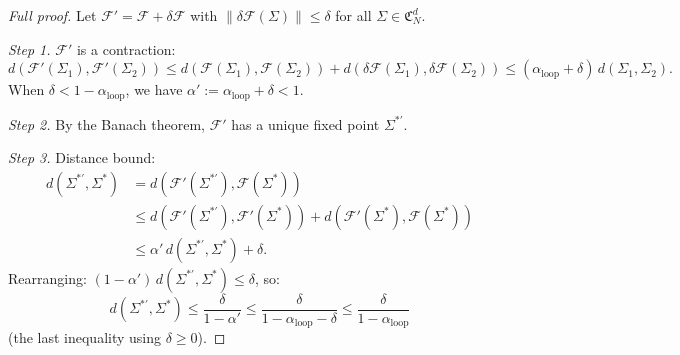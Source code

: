 \begin{proof}[Full proof]
Let $\mathcal{F}' = \mathcal{F} + \delta\mathcal{F}$ with
$\|\delta\mathcal{F}(\Sigma)\| \leq \delta$ for all
$\Sigma \in \mathfrak{C}_N^d$.

\emph{Step 1.}  $\mathcal{F}'$ is a contraction:
\[
  d(\mathcal{F}'(\Sigma_1), \mathcal{F}'(\Sigma_2))
  \leq d(\mathcal{F}(\Sigma_1), \mathcal{F}(\Sigma_2))
  + d(\delta\mathcal{F}(\Sigma_1), \delta\mathcal{F}(\Sigma_2))
  \leq (\alpha_{\mathrm{loop}} + \delta)\,d(\Sigma_1, \Sigma_2).
\]
When $\delta < 1 - \alpha_{\mathrm{loop}}$, we have
$\alpha' := \alpha_{\mathrm{loop}} + \delta < 1$.

\emph{Step 2.}  By the Banach theorem, $\mathcal{F}'$ has a unique
fixed point $\Sigma^{*\prime}$.

\emph{Step 3.}  Distance bound:
\begin{align*}
  d(\Sigma^{*\prime}, \Sigma^*)
  &= d(\mathcal{F}'(\Sigma^{*\prime}), \mathcal{F}(\Sigma^*)) \\
  &\leq d(\mathcal{F}'(\Sigma^{*\prime}), \mathcal{F}'(\Sigma^*))
  + d(\mathcal{F}'(\Sigma^*), \mathcal{F}(\Sigma^*)) \\
  &\leq \alpha' \, d(\Sigma^{*\prime}, \Sigma^*) + \delta.
\end{align*}
Rearranging: $(1 - \alpha')\,d(\Sigma^{*\prime}, \Sigma^*) \leq \delta$,
so:
\[
  d(\Sigma^{*\prime}, \Sigma^*)
  \leq \frac{\delta}{1 - \alpha'}
  \leq \frac{\delta}{1 - \alpha_{\mathrm{loop}} - \delta}
  \leq \frac{\delta}{1 - \alpha_{\mathrm{loop}}}
\]
(the last inequality using $\delta \geq 0$).
\end{proof}
